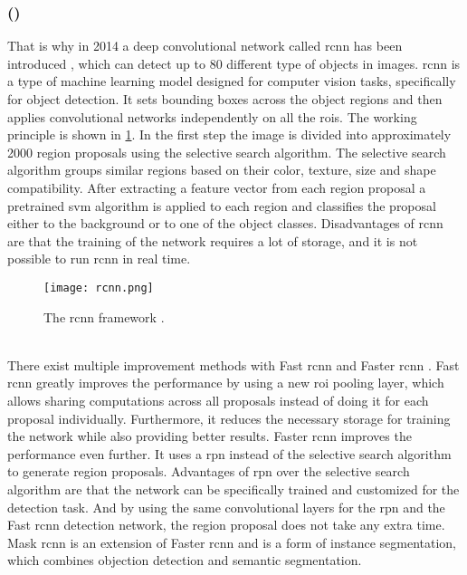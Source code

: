 \subsubsection{ ()}
\label{sssec:rcnn}
That is why in 2014 a deep convolutional network called \gls{rcnn} has been introduced \cite{Girshick2014}, which can detect up to 80 different type of objects in images.
\gls{rcnn} is a type of machine learning model designed for computer vision tasks, specifically for object detection.
It sets bounding boxes across the object regions and then applies convolutional networks independently on all the \glspl{roi}.
The working principle is shown in \cref{fig:rcnn}.
In the first step the image is divided into approximately 2000 region proposals using the selective search algorithm.
The selective search algorithm groups similar regions based on their color, texture, size and shape compatibility.
After extracting a feature vector from each region proposal a pretrained \gls{svm} algorithm is applied to each region and classifies the proposal either to the background or to one of the object classes.
Disadvantages of \gls{rcnn} are that the training of the network requires a lot of storage, and it is not possible to run \gls{rcnn} in real time.
\begin{figure}[htbp]
	\centering
	\texttt{[image: rcnn.png]}
	\caption[\acrshort{rcnn} framework]{The \acrshort{rcnn} framework \cite{Girshick2014}.}
	\label{fig:rcnn}
\end{figure}\\
There exist multiple improvement methods with Fast \gls{rcnn} \cite{Girshick2015} and Faster \gls{rcnn} \cite{Ren2017}.
Fast \gls{rcnn} greatly improves the performance by using a new \gls{roi} pooling layer, which allows sharing computations across all proposals instead of doing it for each proposal individually.
Furthermore, it reduces the necessary storage for training the network while also providing better results.
Faster \gls{rcnn} improves the performance even further.
It uses a \gls{rpn} instead of the selective search algorithm to generate region proposals.
Advantages of \gls{rpn} over the selective search algorithm are that the network can be specifically trained and customized for the detection task.
And by using the same convolutional layers for the \gls{rpn} and the Fast \gls{rcnn} detection network, the region proposal does not take any extra time.\\
Mask \gls{rcnn} \cite{He2017} is an extension of Faster \gls{rcnn} and is a form of instance segmentation, which combines objection detection and semantic segmentation.
